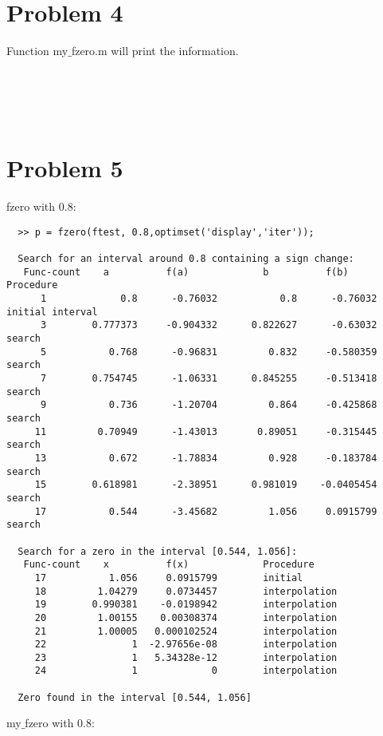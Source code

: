 \documentclass{article}
\begin{document}
\section*{Problem 4}
Function my$\_$fzero.m will print the information.
\\
\\
\\
\\
\\


\section*{Problem 5}

fzero with 0.8:

\begin{verbatim}
  >> p = fzero(ftest, 0.8,optimset('display','iter'));
 
  Search for an interval around 0.8 containing a sign change:
   Func-count    a          f(a)             b          f(b)        Procedure
      1             0.8      -0.76032           0.8      -0.76032   initial interval
      3        0.777373     -0.904332      0.822627      -0.63032   search
      5           0.768      -0.96831         0.832     -0.580359   search
      7        0.754745      -1.06331      0.845255     -0.513418   search
      9           0.736      -1.20704         0.864     -0.425868   search
     11         0.70949      -1.43013       0.89051     -0.315445   search
     13           0.672      -1.78834         0.928     -0.183784   search
     15        0.618981      -2.38951      0.981019    -0.0405454   search
     17           0.544      -3.45682         1.056     0.0915799   search
   
  Search for a zero in the interval [0.544, 1.056]:
   Func-count    x          f(x)             Procedure
     17           1.056     0.0915799        initial
     18         1.04279     0.0734457        interpolation
     19        0.990381    -0.0198942        interpolation
     20         1.00155    0.00308374        interpolation
     21         1.00005   0.000102524        interpolation
     22               1  -2.97656e-08        interpolation
     23               1   5.34328e-12        interpolation
     24               1             0        interpolation
   
  Zero found in the interval [0.544, 1.056]
\end{verbatim}
my$\_$fzero with 0.8:
\end{document}
